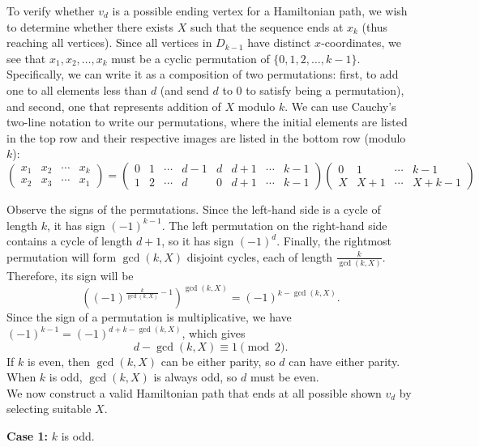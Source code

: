 \documentclass{article}
\begin{document}
    To verify whether $v_d$ is a possible ending vertex for a Hamiltonian path, we wish to determine whether there exists $X$ such that the sequence ends at $x_k$ (thus reaching all vertices). Since all vertices in $D_{k - 1}$ have distinct $x$-coordinates, we see that $x_1, x_2, \dots, x_k$ must be a cyclic permutation of $\{0, 1, 2,\dots, k - 1\}$. Specifically, we can write it as a composition of two permutations: first, to add one to all elements less than $d$ (and send $d$ to $0$ to satisfy being a permutation), and second, one that represents addition of $X$ modulo $k$. We can use Cauchy's two-line notation to write our permutations, where the initial elements are listed in the top row and their respective images are listed in the bottom row (modulo $k$):
    $$\begin{pmatrix} 
    x_1 & x_2 & \cdots & x_k \\
    x_2 & x_3 & \cdots & x_1 \end{pmatrix} = 
    \begin{pmatrix} 
    0 & 1 & \cdots & d - 1 & d & d + 1 & \cdots & k - 1 \\
    1 & 2 & \cdots & d & 0 & d + 1 & \cdots & k - 1 \end{pmatrix} 
    \begin{pmatrix} 
    0 & 1 & \cdots & k - 1 \\
    X & X + 1 & \cdots & X + k - 1\end{pmatrix}$$
    
    Observe the signs of the permutations. Since the left-hand side is a cycle of length $k$, it has sign $(-1)^{k - 1}$. The left permutation on the right-hand side contains a cycle of length $d + 1$, so it has sign $(-1)^d$. Finally, the rightmost permutation will form $\gcd(k, X)$ disjoint cycles, each of length $\frac{k}{\gcd(k, X)}.$ Therefore, its sign will be $$\left((-1)^{\frac{k}{\gcd(k, X)} - 1}\right)^{\gcd(k, X)} = (-1)^{k - \gcd(k, X)}.$$
    Since the sign of a permutation is multiplicative, we have $(-1)^{k - 1} = (-1)^{d + k - \gcd(k, X)}$, which gives
    $$d - \gcd(k, X)\equiv 1 \pmod{2}.$$
    If $k$ is even, then $\gcd(k, X)$ can be either parity, so $d$ can have either parity. When $k$ is odd, $\gcd(k, X)$ is always odd, so $d$ must be even. \\

    We now construct a valid Hamiltonian path that ends at all possible shown $v_d$ by selecting suitable $X$.

    \textbf{Case 1:} $k$ is odd.
\end{document}
